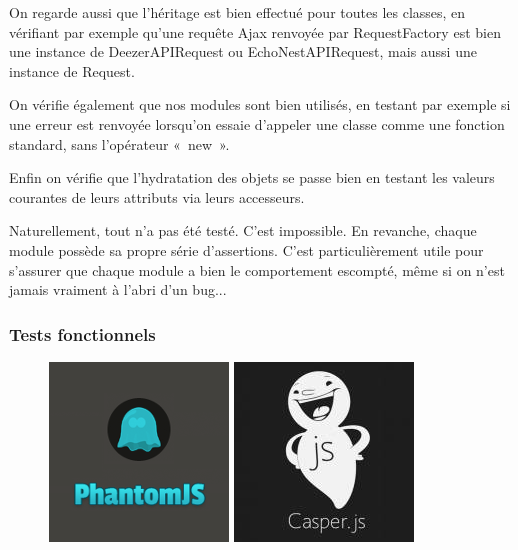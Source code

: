 \documentclass[a4paper,12pt]{article}
\begin{document}
On regarde aussi que l'héritage est bien effectué pour toutes les classes, en vérifiant par exemple qu'une requête Ajax renvoyée par RequestFactory est bien une instance de DeezerAPIRequest ou EchoNestAPIRequest, mais aussi une instance de Request.

On vérifie également que nos modules sont bien utilisés, en testant par exemple si une erreur est renvoyée lorsqu'on essaie d'appeler une classe comme une fonction standard, sans l'opérateur «~new~».

Enfin on vérifie que l'hydratation des objets se passe bien en testant les valeurs courantes de leurs attributs via leurs accesseurs.

Naturellement, tout n'a pas été testé. C'est impossible. En revanche, chaque module possède sa propre série d'assertions. C'est particulièrement utile pour s'assurer que chaque module a bien le comportement escompté, même si on n'est jamais vraiment à l'abri d'un bug...

\newpage

\subsubsection{Tests fonctionnels}

\begin{figure}[!h]
  \begin{center}
    \includegraphics[scale=0.5]{logo-phantomjs.png}
    \includegraphics[scale=0.5]{logo-casperjs.jpg}
  \end{center}
\end{figure}
\end{document}
